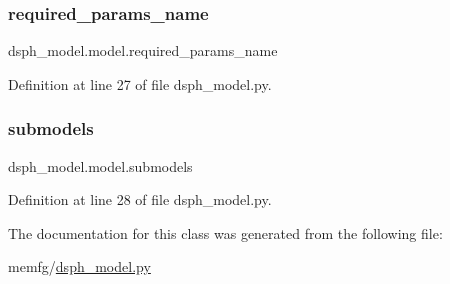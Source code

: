 \subsubsection{\texorpdfstring{required\+\_\+params\+\_\+name}{required\_params\_name}}
{\footnotesize\ttfamily dsph\+\_\+model.\+model.\+required\+\_\+params\+\_\+name}



Definition at line 27 of file dsph\+\_\+model.\+py.

\mbox{\label{classdsph__model_1_1model_ab75d0b914dcaeb85599e434ee7ea22dc}} 
\subsubsection{\texorpdfstring{submodels}{submodels}}
{\footnotesize\ttfamily dsph\+\_\+model.\+model.\+submodels}



Definition at line 28 of file dsph\+\_\+model.\+py.



The documentation for this class was generated from the following file\+:\begin{DoxyCompactItemize}
\item 
memfg/\hyperlink{dsph__model_8py}{dsph\+\_\+model.\+py}\end{DoxyCompactItemize}
